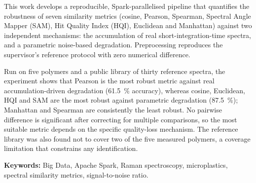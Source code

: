 This work develops a reproducible, Spark-parallelised pipeline that quantifies the robustness of seven similarity metrics (cosine, Pearson, Spearman, Spectral Angle Mapper (SAM), Hit Quality Index (HQI), Euclidean and Manhattan) against two independent mechanisms: the accumulation of real short-integration-time spectra, and a parametric noise-based degradation. Preprocessing reproduces the supervisor's reference protocol with zero numerical difference.

Run on five polymers and a public library of thirty reference spectra, the experiment shows that Pearson is the most robust metric against real accumulation-driven degradation (61.5~\% accuracy), whereas cosine, Euclidean, HQI and SAM are the most robust against parametric degradation (87.5~\%); Manhattan and Spearman are consistently the least robust. No pairwise difference is significant after correcting for multiple comparisons, so the most suitable metric depends on the specific quality-loss mechanism. The reference library was also found not to cover two of the five measured polymers, a coverage limitation that constrains any identification.

\textbf{Keywords:} Big Data, Apache Spark, Raman spectroscopy, microplastics, spectral similarity metrics, signal-to-noise ratio.
